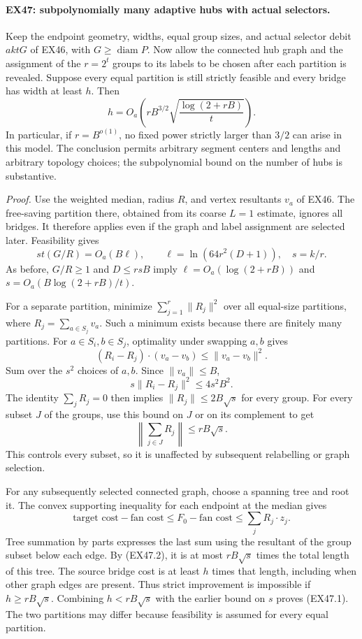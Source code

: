 \paragraph{EX47: subpolynomially many adaptive hubs with actual selectors.}
Keep the endpoint geometry, widths, equal group sizes, and actual
selector debit $aktG$ of EX46, with $G\ge\operatorname{diam}P$.
Now allow the connected hub graph and the assignment of the $r=2^t$
groups to its labels to be chosen after each partition is revealed.
Suppose every equal partition is still strictly feasible and every
bridge has width at least $h$. Then
\[
 h=O_a\!\left(rB^{3/2}
          \sqrt{\frac{\log(2+rB)}{t}}\right).
 \tag{EX47.1}
\]
In particular, if $r=B^{o(1)}$, no fixed power strictly larger than
$3/2$ can arise in this model. The conclusion permits arbitrary
segment centers and lengths and arbitrary topology choices; the
subpolynomial bound on the number of hubs is substantive.

\emph{Proof.}
Use the weighted median, radius $R$, and vertex resultants $v_a$ of
EX46. The free-saving partition there, obtained from its coarse
$L=1$ estimate, ignores all bridges. It therefore applies even if
the graph and label assignment are selected later. Feasibility gives
\[
                       st(G/R)=O_a(B\ell),\qquad
               \ell=\ln(64r^2(D+1)),\quad s=k/r.
\]
As before, $G/R\ge1$ and $D\le rsB$ imply
$\ell=O_a(\log(2+rB))$ and
$s=O_a(B\log(2+rB)/t)$.

For a separate partition, minimize $\sum_{j=1}^r\|R_j\|^2$
over all equal-size partitions, where $R_j=\sum_{a\in S_j}v_a$.
Such a minimum exists because there are finitely many partitions.
For $a\in S_i,b\in S_j$, optimality under swapping $a,b$ gives
\[
 (R_i-R_j)\cdot(v_a-v_b)\le\|v_a-v_b\|^2.
\]
Sum over the $s^2$ choices of $a,b$. Since $\|v_a\|\le B$,
\[
             s\|R_i-R_j\|^2\le4s^2B^2.
\]
The identity $\sum_jR_j=0$ then implies
$\|R_j\|\le2B\sqrt s$ for every group. For every subset
$J$ of the groups, use this bound on $J$ or on its complement to get
\[
                         \left\|\sum_{j\in J}R_j\right\|
                              \le rB\sqrt s.
 \tag{EX47.2}
\]
This controls every subset, so it is unaffected by subsequent
relabelling or graph selection.

For any subsequently selected connected graph, choose a spanning
tree and root it. The convex supporting inequality for each endpoint
at the median gives
\[
 \text{target cost}-\text{fan cost}
       \le F_0-\text{fan cost}\le\sum_jR_j\cdot z_j.
\]
Tree summation by parts expresses the last sum using the resultant
of the group subset below each edge. By (EX47.2), it is at most
$rB\sqrt s$ times the total length of this tree. The source bridge
cost is at least $h$ times that length, including when other graph
edges are present. Thus strict improvement is impossible if
$h\ge rB\sqrt s$. Combining $h<rB\sqrt s$ with the earlier bound
on $s$ proves (EX47.1). The two partitions may differ because
feasibility is assumed for every equal partition.

